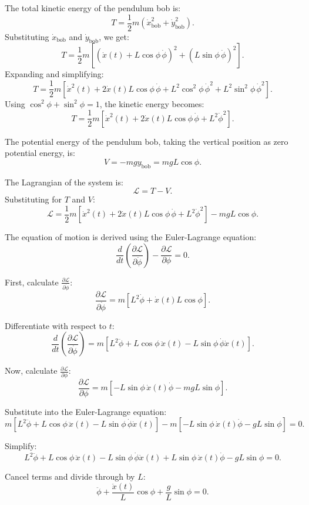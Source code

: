 \documentclass{article}
\begin{document}
The total kinetic energy of the pendulum bob is:
\[
T = \frac{1}{2}m\left(\dot{x}_\text{bob}^2 + \dot{y}_\text{bob}^2\right).
\]
Substituting $\dot{x}_\text{bob}$ and $\dot{y}_\text{bob}$, we get:
\[
T = \frac{1}{2}m\left[\left(\dot{x}(t) + L\cos\phi \, \dot{\phi}\right)^2 + \left(L\sin\phi \, \dot{\phi}\right)^2\right].
\]
Expanding and simplifying:
\[
T = \frac{1}{2}m\left[\dot{x}^2(t) + 2\dot{x}(t)L\cos\phi \, \dot{\phi} + L^2\cos^2\phi \, \dot{\phi}^2 + L^2\sin^2\phi \, \dot{\phi}^2\right].
\]
Using $\cos^2\phi + \sin^2\phi = 1$, the kinetic energy becomes:
\[
T = \frac{1}{2}m\left[\dot{x}^2(t) + 2\dot{x}(t)L\cos\phi \, \dot{\phi} + L^2\dot{\phi}^2\right].
\]

The potential energy of the pendulum bob, taking the vertical position as zero potential energy, is:
\[
V = -mg y_\text{bob} = mgL\cos\phi.
\]

The Lagrangian of the system is:
\[
\mathcal{L} = T - V.
\]
Substituting for $T$ and $V$:
\[
\mathcal{L} = \frac{1}{2}m\left[\dot{x}^2(t) + 2\dot{x}(t)L\cos\phi \, \dot{\phi} + L^2\dot{\phi}^2\right] - mgL\cos\phi.
\]

The equation of motion is derived using the Euler-Lagrange equation:
\[
\frac{d}{dt}\left(\frac{\partial \mathcal{L}}{\partial \dot{\phi}}\right) - \frac{\partial \mathcal{L}}{\partial \phi} = 0.
\]

First, calculate $\frac{\partial \mathcal{L}}{\partial \dot{\phi}}$:
\[
\frac{\partial \mathcal{L}}{\partial \dot{\phi}} = m\left[L^2\dot{\phi} + \dot{x}(t)L\cos\phi\right].
\]

Differentiate with respect to $t$:
\[
\frac{d}{dt}\left(\frac{\partial \mathcal{L}}{\partial \dot{\phi}}\right) = m\left[L^2\ddot{\phi} + L\cos\phi \, \ddot{x}(t) - L\sin\phi \, \dot{\phi}\dot{x}(t)\right].
\]

Now, calculate $\frac{\partial \mathcal{L}}{\partial \phi}$:
\[
\frac{\partial \mathcal{L}}{\partial \phi} = m\left[-L\sin\phi \, \dot{x}(t)\dot{\phi} - mgL\sin\phi\right].
\]

Substitute into the Euler-Lagrange equation:
\[
m\left[L^2\ddot{\phi} + L\cos\phi \, \ddot{x}(t) - L\sin\phi \, \dot{\phi}\dot{x}(t)\right] - m\left[-L\sin\phi \, \dot{x}(t)\dot{\phi} - gL\sin\phi\right] = 0.
\]

Simplify:
\[
L^2\ddot{\phi} + L\cos\phi \, \ddot{x}(t) - L\sin\phi \, \dot{\phi}\dot{x}(t) + L\sin\phi \, \dot{x}(t)\dot{\phi} - gL\sin\phi = 0.
\]

Cancel terms and divide through by $L$:
\[
\ddot{\phi} + \frac{\ddot{x}(t)}{L}\cos\phi + \frac{g}{L}\sin\phi = 0.
\]
\end{document}
